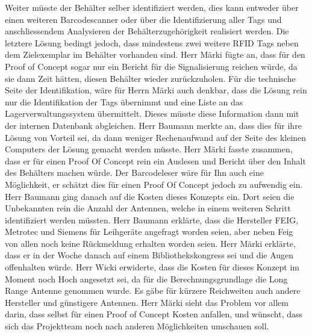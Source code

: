 \documentclass[parskip=full, a4paper]{scrreprt}
\begin{document}
Weiter müsste der Behälter selber identifiziert werden, dies kann entweder über einen weiteren Barcodescanner oder über die Identifizierung aller Tags und anschliessendem Analysieren der Behälterzugehörigkeit realisiert werden. Die letztere Lösung bedingt jedoch, dass mindestens zwei weitere RFID Tags neben dem Zielexemplar im Behälter vorhanden sind.
Herr Märki fügte an, dass für den Proof of Concept sogar nur ein Bericht für die Signalisierung reichen würde, da sie dann Zeit hätten, diesen Behälter wieder zurückzuholen. Für die technische Seite der Identifikation, wäre für Herrn Märki auch denkbar, dass die Lösung rein nur die Identifikation der Tags übernimmt und eine Liste an das Lagerverwaltungssystem übermittelt. Dieses müsste diese Information dann mit der internen Datenbank abgleichen. Herr Baumann merkte an, dass dies für ihre Lösung von Vorteil sei, da dann weniger Rechenaufwand auf der Seite des kleinen Computers der Lösung gemacht werden müsste. Herr Märki fasste zusammen, dass er für einen Proof Of Concept rein ein Auslesen und Bericht über den Inhalt des Behälters machen würde. Der Barcodeleser wäre für Ihn auch eine Möglichkeit, er schätzt dies für einen Proof Of Concept jedoch zu aufwendig ein.
Herr Baumann ging danach auf die Kosten dieses Konzepts ein. Dort seien die Unbekannten rein die Anzahl der Antennen, welche in einem weiteren Schritt identifiziert werden müssten.
Herr Baumann erklärte, dass die Hersteller FEIG, Metrotec und Siemens für Leihgeräte angefragt worden seien, aber neben Feig von allen noch keine Rückmeldung erhalten worden seien. Herr Märki erklärte, dass er in der Woche danach auf einem Bibliothekskongress sei und die Augen offenhalten würde.
Herr Wicki erwiderte, dass die Kosten für dieses Konzept im Moment noch Hoch angesetzt sei, da für die Berechnungsgrundlage die Long Range Antenne genommen wurde. Es gäbe für kürzere Reichweiten auch andere Hersteller und günstigere Antennen. Herr Märki sieht das Problem vor allem darin, dass selbst für einen Proof of Concept Kosten anfallen, und wünscht, dass sich das Projektteam noch nach anderen Möglichkeiten umschauen soll.
\end{document}

